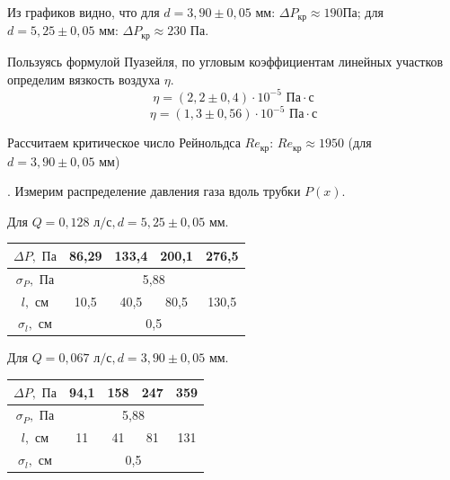 \documentclass[a4paper,12pt]{article} %
\begin{document}
\medskip
\medskip

\noindent Из графиков видно, что для $d = 3,90 \pm 0,05 \text{ мм}$: $\Delta P_\text{кр} \approx 190 \text{Па}$; для $d = 5,25 \pm 0,05 \text{ мм}$: $\Delta P_\text{кр} \approx 230 \text{ Па}$.

\medskip
\medskip

\noindent Пользуясь формулой Пуазейля, по угловым коэффициентам линейных участков определим вязкость воздуха $ \eta $. 
$$ \eta = (2,2 \pm 0,4) \cdot 10^{-5} \text{ Па} \cdot \text{с}$$
$$ \eta = (1,3 \pm 0,56) \cdot 10^{-5} \text{ Па} \cdot \text{с}$$

\medskip

\noindent Рассчитаем критическое число Рейнольдса $ Re_\text{кр} $: $ Re_\text{кр} \approx 1950$ (для $d = 3,90 \pm 0,05 \text{ мм}$)

\medskip

. Измерим распределение давления газа вдоль трубки $P(x)$.

\medskip

\noindent Для $Q = 0,128 \text{ л/с}, d = 5,25 \pm 0,05 \text{ мм}$.

\medskip
\medskip

\begin{tabular}{|c|c|c|c|c|}
\hline 
$ \Delta P, \text{ Па}$ & 86,29 & 133,4 & 200,1 & 276,5 \\ 
\hline 
$\sigma_P, \text{ Па}$ & \multicolumn{4}{c|}{5,88}\\
\hline
$ l, \text{ см}$ & 10,5 & 40,5 & 80,5 & 130,5 \\ 
\hline 
$\sigma_l, \text{ см}$ & \multicolumn{4}{c|}{0,5}\\
\hline
\end{tabular} 

\medskip
\medskip

\noindent Для $Q = 0,067 \text{ л/с}, d = 3,90 \pm 0,05 \text{ мм}$.

\medskip
\medskip

\begin{tabular}{|c|c|c|c|c|}
\hline 
$ \Delta P, \text{ Па}$ & 94,1 & 158 & 247 & 359 \\ 
\hline 
$\sigma_P, \text{ Па}$ & \multicolumn{4}{c|}{5,88}\\
\hline
$ l, \text{ см}$ & 11 & 41 & 81 & 131 \\ 
\hline 
$\sigma_l, \text{ см}$ & \multicolumn{4}{c|}{0,5}\\
\hline
\end{tabular} 
\end{document}
